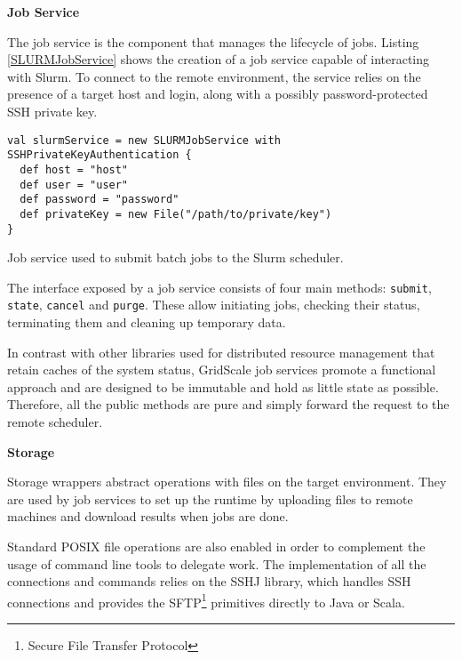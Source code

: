 \vspace{3mm}
\textbf{Job Service}
\vspace{1mm}

The job service is the component that manages the lifecycle of jobs. Listing \ref{SLURMJobService} shows the creation of a job service capable of interacting with Slurm. To connect to the remote environment, the service relies on the presence of a target host and login, along with a possibly password-protected SSH private key.

\begin{listing}[h]
	\centering
	\begin{minipage}{14cm}
		\begin{verbatim}
val slurmService = new SLURMJobService with SSHPrivateKeyAuthentication {
  def host = "host"
  def user = "user"
  def password = "password"
  def privateKey = new File("/path/to/private/key")
}
		\end{verbatim}
	\end{minipage}
	\caption{Job service used to submit batch jobs to the Slurm scheduler.}
	\label{SLURMJobService}
\end{listing}

The interface exposed by a job service consists of four main methods: \verb|submit|, \verb|state|, \verb|cancel| and \verb|purge|. These allow initiating jobs, checking their status, terminating them and cleaning up temporary data. 

In contrast with other libraries used for distributed resource management that retain caches of the system status, GridScale job services promote a functional approach and are designed to be immutable and hold as little state as possible. Therefore, all the public methods are pure and simply forward the request to the remote scheduler.

\vspace{3mm}
\textbf{Storage}
\vspace{1mm}

Storage wrappers abstract operations with files on the target environment. They are used by job services to set up the runtime by uploading files to remote machines and download results when jobs are done.

Standard POSIX file operations are also enabled in order to complement the usage of command line tools to delegate work. The implementation of all the connections and commands relies on the SSHJ \cite{SSHJ} library, which handles SSH connections and provides the SFTP\footnote{Secure File Transfer Protocol} primitives directly to Java or Scala.

